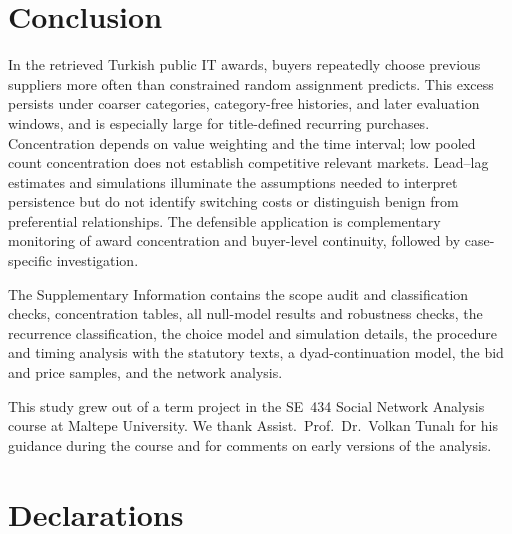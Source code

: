 \documentclass[pdflatex,sn-apa]{sn-jnl}
\begin{document}
\section{Conclusion}\label{sec:conclusion}
In the retrieved Turkish public IT awards, buyers repeatedly choose previous suppliers more often than constrained random assignment predicts. This excess persists under coarser categories, category-free histories, and later evaluation windows, and is especially large for title-defined recurring purchases. Concentration depends on value weighting and the time interval; low pooled count concentration does not establish competitive relevant markets. Lead--lag estimates and simulations illuminate the assumptions needed to interpret persistence but do not identify switching costs or distinguish benign from preferential relationships. The defensible application is complementary monitoring of award concentration and buyer-level continuity, followed by case-specific investigation.

\backmatter

The Supplementary Information contains the scope audit and classification checks, concentration tables, all null-model results and robustness checks, the recurrence classification, the choice model and simulation details, the procedure and timing analysis with the statutory texts, a dyad-continuation model, the bid and price samples, and the network analysis.

This study grew out of a term project in the SE~434 Social Network Analysis course at Maltepe University. We thank Assist.\ Prof.\ Dr.\ Volkan Tunal\i{} for his guidance during the course and for comments on early versions of the analysis.

\section*{Declarations}
\end{document}
